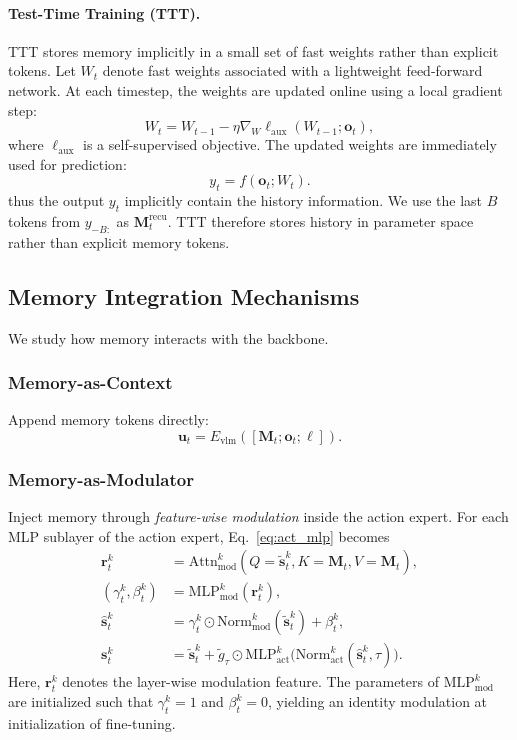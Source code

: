 \paragraph{Test-Time Training (TTT).}
TTT stores memory implicitly in a small set of fast weights rather than explicit tokens.
Let $W_t$ denote fast weights associated with a lightweight feed-forward network. At each timestep, the weights are updated online using a local gradient step:
\begin{equation}
W_t
=
W_{t-1}
-
\eta \nabla_W \ell_{\text{aux}}(W_{t-1}; \mathbf{o}_t),
\end{equation}
where $\ell_{\text{aux}}$ is a self-supervised objective.
The updated weights are immediately used for prediction:
\[
y_t = f(\mathbf{o}_t; W_t).
\]
thus the output $y_t$ implicitly contain the history information. 
We use the last $B$ tokens from $y_{-B:}$ as $\mathbf{M}_t^{\text{recu}}$.
TTT therefore stores history in parameter space rather than explicit memory tokens.


\subsection{Memory Integration Mechanisms}
\label{sec:memory_integration}

We study how memory interacts with the backbone.

\subsubsection{Memory-as-Context}

Append memory tokens directly:
\[
\mathbf{u}_t
=
E_{\text{vlm}}([\mathbf{M}_t; \mathbf{o}_t;\boldsymbol{\ell}]).
\]

\subsubsection{Memory-as-Modulator}
Inject memory through \emph{feature-wise modulation} inside the action expert.
For each MLP sublayer of the action expert, Eq.~\ref{eq:act_mlp} becomes
\begin{align}
\mathbf{r}_t^{k}
&=\mathrm{Attn}^{k}_{\text{mod}}(Q=\tilde{\mathbf{s}}_t^{k}, K=\mathbf{M}_t, V=\mathbf{M}_t), \\
(\gamma_t^k,\beta_t^k)
&=
\mathrm{MLP}_{\text{mod}}^{k}(\mathbf{r}_t^{k}), \\
\widehat{\mathbf{s}}_t^{k}&=\gamma_t^k \odot
\mathrm{Norm}_{\text{mod}}^{k}(\tilde{\mathbf{s}}_t^{k})
+ \beta_t^k,\\
\mathbf{s}_t^{k}
&=
\tilde{\mathbf{s}}_t^{k}
+
\tilde{g}_{\tau} \odot
\mathrm{MLP}_{\text{act}}^{k}\!\Big(
\mathrm{Norm}_{\text{act}}^{k}(\widehat{\mathbf{s}}_t^{k}, \tau)\Big).
\end{align}
Here, $\mathbf{r}_t^{k}$ denotes the layer-wise modulation feature.
The parameters of $\mathrm{MLP}_{\text{mod}}^{k}$ are initialized such that
$\gamma_t^k=1$ and $\beta_t^k=0$, yielding an identity modulation at initialization of fine-tuning.


